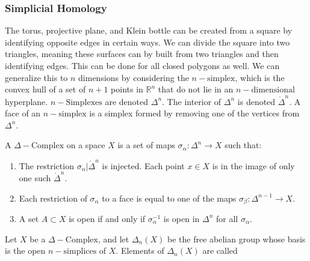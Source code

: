 \documentclass[crop=false,class=article,oneside]{standalone}
\begin{document}
        \subsubsection{Simplicial Homology}
            The torus, projective plane, and Klein bottle can
            be created from a square by identifying opposite
            edges in certain ways. We can divide the square
            into two triangles, meaning these surfaces can by
            built from two triangles and then identifying
            edges. This can be done for all closed polygons
            as well. We can generalize this to $n$ dimensions
            by considering the $n-\textrm{simplex}$, which is
            the convex hull of a set of $n+1$ points in
            $\mathbb{R}^{n}$ that do not lie in an
            $n-\textrm{dimensional}$ hyperplane.
            $n-\textrm{Simplexes}$ are denoted $\Delta^{n}$.
            The interior of $\Delta^{n}$ is denoted
            $\mathring{\Delta}^{n}$. A face of an
            $n-\textrm{simplex}$ is a simplex formed by
            removing one of the vertices from $\Delta^{n}$.
            \begin{definition}
                A $\Delta-\textrm{Complex}$ on a space $X$ is
                a set of maps
                $\sigma_{\alpha}:\Delta^{n}\rightarrow X$
                such that:
                \begin{enumerate}
                    \item The restriction
                        $\sigma_{\alpha}|\mathring{\Delta}^{n}$
                        is injected. Each point $x\in X$ is
                        in the image of only one such
                        $\mathring{\Delta}^{n}$.
                    \item Each restriction of $\sigma_{\alpha}$
                        to a face is equal to one of the maps
                        $\sigma_{\beta}:%
                         \Delta^{n-1}\rightarrow X$.
                    \item A set $A\subset X$ is open if and only
                        if $\sigma_{\alpha}^{-1}$ is open in
                        $\Delta^{n}$ for all $\sigma_{\alpha}$.
                \end{enumerate}
            \end{definition}
            Let $X$ be a $\Delta-\textrm{Complex}$, and let
            $\Delta_{n}(X)$ be the free abelian group whose
            basis is the open $n-\textrm{simplices}$ of $X$.
            Elements of $\Delta_{n}(X)$ are called
\end{document}
